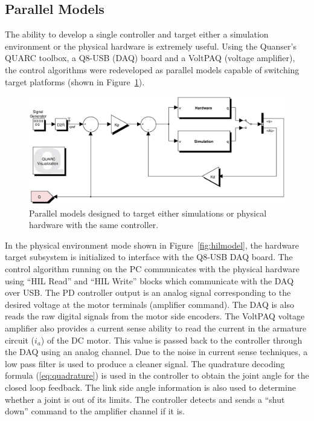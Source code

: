 \subsection{Parallel Models} %
\label{sub:parallel_models}

The ability to develop a single controller and target either a simulation environment or the physical hardware is extremely useful. Using the Quanser's QUARC toolbox, a Q8-USB (DAQ) board and a VoltPAQ (voltage amplifier), the control algorithms were redeveloped as parallel models capable of switching target platforms (shown in Figure~\ref{fig:parallelmodels}).

\begin{figure}[!h]
	\centering
    \includegraphics[scale=0.6]{fig/experiments/parallelmodels.eps} 
  	\caption{Parallel models designed to target either simulations or physical hardware with the same controller.}
	\label{fig:parallelmodels}
\end{figure}

In the physical environment mode shown in Figure~\ref{fig:hilmodel}, the hardware target subsystem is initialized to interface with the Q8-USB DAQ board. The control algorithm running on the PC communicates with the physical hardware using ``HIL Read'' and ``HIL Write'' blocks which communicate with the DAQ over USB. The PD controller output is an analog signal corresponding to the desired voltage at the motor terminals (amplifier command). The DAQ is also reads the raw digital signals from the motor side encoders. The VoltPAQ voltage amplifier also provides a current sense ability to read the current in the armature circuit ($i_a$) of the DC motor. This value is passed back to the controller through the DAQ using an analog channel. Due to the noise in current sense techniques, a low pass filter is used to produce a cleaner signal. The quadrature decoding formula (\ref{eq:quadrature}) is used in the controller to obtain the joint angle for the closed loop feedback. The link side angle information is also used to determine whether a joint is out of its limits. The controller detects and sends a ``shut down'' command to the amplifier channel if it is. 

